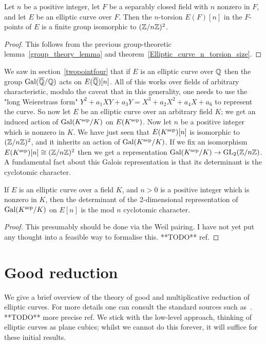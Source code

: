 \begin{corollary}\label{Elliptic_curve_n_torsion_2d}
  Let $n$ be a positive integer, let $F$ be a separably closed
  field with $n$ nonzero in $F$, and let $E$ be an elliptic curve over $F$. Then the $n$-torsion $E(F)[n]$ 
  in the $F$-points of $E$ is a finite group isomorphic to $(\mathbb{Z}/n\mathbb{Z})^2$.
\end{corollary}
\begin{proof}
  This follows from the previous group-theoretic lemma~\ref{group_theory_lemma} and
  theorem~\ref{Elliptic_curve_n_torsion_size}.
\end{proof}

We saw in section~\ref{twopointfour} that if $E$ is an elliptic curve over $\mathbb{Q}$ then the group $\operatorname{Gal}(\overline{\mathbb{Q}}/\mathbb{Q})$ acts on $E(\overline{\mathbb{Q}})[n]$. All of this works over fields of arbitrary characteristic, modulo the caveat that in this generality, one needs to use the "long Weierstrass form" $Y^2+a_1XY+a_3Y=X^3+a_2X^2+a_4X+a_6$ to represent the curve. So now let $E$ be an elliptic curve over an arbitrary field $K$; we get an induced action of $\operatorname{Gal}(K^{\operatorname{sep}}/K)$ on $E(K^{\operatorname{sep}})$. Now let $n$ be a positive integer which is nonzero in $K$. We have just seen that $E(K^{\operatorname{sep}})[n]$ is isomorphic to $(\mathbb{Z}/n\mathbb{Z})^2$, and it inherits an action of $\operatorname{Gal}(K^{\operatorname{sep}}/K)$. If we fix an isomorphism $E(K^{\operatorname{sep}})[n]\cong(\mathbb{Z}/n\mathbb{Z})^2$ then we get a representation $\operatorname{Gal}(K^{\operatorname{sep}}/K)\to\operatorname{GL}_2(\mathbb{Z}/n\mathbb{Z})$. A fundamental fact about this Galois representation is that its determinant is the cyclotomic character.

\begin{theorem}\label{Elliptic_curve_det_n_torsion} If $E$ is an elliptic curve over a field $K$, and $n>0$ is a positive integer which is nonzero in $K$, then the determinant of the 2-dimensional representation of $\operatorname{Gal}(K^{\operatorname{sep}}/K)$ on $E[n]$ is the mod $n$ cyclotomic character.
\end{theorem}
\begin{proof}
  This presumably should be done via the Weil pairing. I have not yet put any thought into a feasible way to formalise this. **TODO** ref.
\end{proof}

\section{Good reduction}

We give a brief overview of the theory of good and multiplicative reduction of elliptic curves.
For more details one can consult the standard sources such as~\cite{silverman1}. **TODO** more
precise ref. We stick with the low-level approach, thinking of elliptic curves as plane cubics; whilst we cannot do this forever, it will suffice for these initial results.

